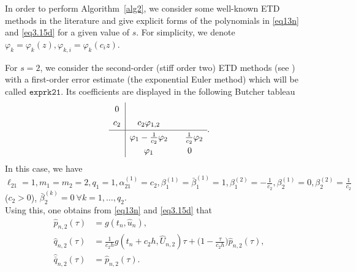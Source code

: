 In order to perform Algorithm~\ref{alg2}, we consider some well-known ETD methods in the literature and give explicit forms of the polynomials in \eqref{eq13n} and \eqref{eq3.15d} for a given value of $s$. For simplicity, we denote $\varphi_{k}=\varphi_{k} (z), \varphi_{k,i}=\varphi_{k} (c_i z)$. 
\begin{examp}\label{ex3.2.2}\rm
For $s=2$, we consider the second-order (stiff order two) ETD methods (see \cite[Sect. 5.1]{HO05b}) with a first-order error estimate (the exponential Euler method) which will be called $\mathtt{exprk21}$. Its coefficients are displayed in the following Butcher tableau 
\begin{displaymath}
\renewcommand{\arraystretch}{1.3}
\begin{array}{c|cc}
0 &&\\
c_2 & c_2 \varphi_{1,2} &\\[1pt]
\hline
& \varphi_1-\frac{1}{c_2}\varphi_2 & \q \frac{1}{c_2}\varphi_2 \\
& \varphi_1 & 0 
\end{array}.
\end{displaymath}
In this case, we have 
$\ell_{21}=1, m_1=m_2=2, q_1=1, \alpha^{(1)}_{21}=c_2, \beta^{(1)}_{1}=\bar{\beta}^{(1)}_{1}=1, \beta^{(2)}_{1}=-\frac{1}{c_2}, \beta^{(1)}_{2}=0, \beta^{(2)}_{2}=\frac{1}{c_2}$ ($c_2>0$), $\bar{\beta}^{(k)}_{2}=0 \ \forall k=1,\ldots,q_2.$\\ 
Using this, one obtains from \eqref{eq13n} and \eqref{eq3.15d}  that
\begin{subequations} \label{eq3.17}
\begin{align}
 \hat{p}_{n,2}(\tau)&=  g(t_n, \hat{u}_n), \label{eq3.17a} \\
\hat{q}_{n,2}(\tau) &= \tfrac{1}{c_2 h}g(t_n+c_2 h, \widehat{U}_{n,2})\tau + \big(1-\tfrac{\tau}{c_2 h}\big)\hat{p}_{n,2}(\tau),  \label{eq3.17b} \\
\widehat{\bar{q}}_{n,2}(\tau) &= \hat{p}_{n,2}(\tau). \label{eq3.17c}
\end{align}
\end{subequations} 
\end{examp}
